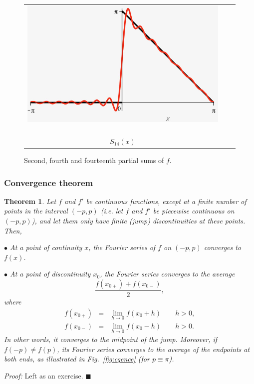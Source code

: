 \documentclass[12pt]{article}
\numberwithin{equation}{section}
\newtheorem{theorem}{Theorem}[section]
\newenvironment{proof}{\textsl{Proof:}}{\hspace*{\fill}$\blacksquare$\\}
\begin{document}
\begin{figure}[H]
\begin{tabular}{cc}
\includegraphics[scale=0.25]{Figs/s14.jpg}~~&~~\\
$S_{14}(x)$&
\end{tabular}
\caption{\small Second, fourth and fourteenth  partial sums of $f$.}
\label{fig:fourier3}
\end{figure}
\subsubsection{Convergence theorem}

\begin{theorem}
\normalfont Let \( f \) and $f'$ be continuous functions, except at a
finite number of points in the interval $(-p,p)$ (i.e. let $f$ and $f'$ be piecewise continuous on $(-p,p)$), and let them only have
finite (jump) discontinuities at these points. Then,

$\bullet$ At a point of continuity $x$, the Fourier series of $f$ on $(-p,p)$
converges to $f(x)$.

\noindent $\bullet$ At a point of discontinuity $x_0$, the Fourier series converges to 
the average
\[
\frac{f(x_{0+})+f(x_{0-})}{2},
\]
where
\begin{eqnarray*}
f(x_{0+})&=& \lim_{h \rightarrow 0}f(x_0+h)\qquad h>0,\\
f(x_{0-})&=& \lim_{h \rightarrow 0}f(x_0-h)\qquad h>0.
\end{eqnarray*}
In other words, it converges to the midpoint of the jump. Moreover, if $f(-p)\neq f(p)$, its Fourier series converges to the average of the endpoints at both ends, as illustrated in Fig.~\ref{fig:cgence} (for $p\equiv \pi$).
\end{theorem}
\begin{proof}
Left as an exercise.
\end{proof}
\end{document}
